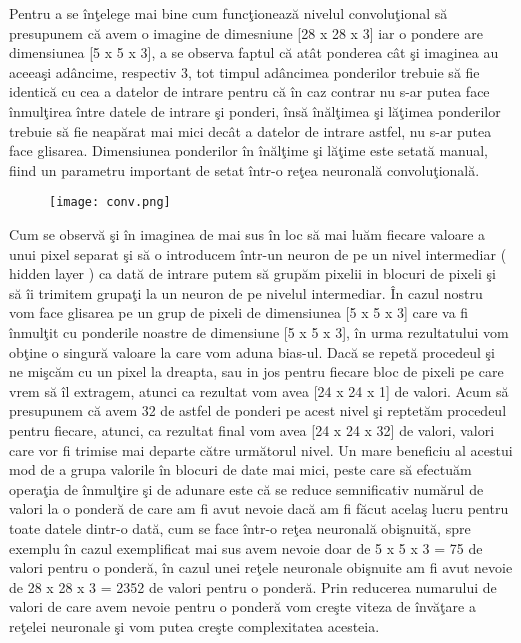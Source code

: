 \par

Pentru a se \^{i}n\c{t}elege mai bine cum func\c{t}ioneaz\u{a} nivelul convolu\c{t}ional s\u{a} presupunem c\u{a} avem o imagine de dimesniune [28 x 28 x 3] iar o pondere are dimensiunea [5 x 5 x 3], a se observa faptul c\u{a} at\^{a}t  ponderea c\^{a}t \c{s}i imaginea au aceea\c{s}i ad\^{a}ncime, respectiv 3, tot timpul ad\^{a}ncimea ponderilor trebuie s\u{a} fie identic\u{a} cu cea a datelor de intrare pentru c\u{a} \^{i}n caz contrar nu s-ar putea face \^{i}nmul\c{t}irea \^{i}ntre datele de intrare \c{s}i ponderi, \^{i}ns\u{a} \^{i}n\u{a}l\c{t}imea \c{s}i l\u{a}\c{t}imea ponderilor trebuie s\u{a} fie neap\u{a}rat mai mici dec\^{a}t a datelor de intrare astfel, nu s-ar putea face glisarea. Dimensiunea ponderilor \^{i}n \^{i}n\u{a}l\c{t}ime \c{s}i l\u{a}\c{t}ime este setat\u{a} manual, fiind un parametru important de setat \^{i}ntr-o re\c{t}ea neuronal\u{a} convolu\c{t}ional\u{a}. 

\begin{figure}[h!]
  \centering
  \texttt{[image: conv.png]}
\end{figure}

Cum se observ\u{a} \c{s}i \^{i}n imaginea de mai sus \^{i}n loc s\u{a} mai lu\u{a}m fiecare valoare a unui pixel separat \c{s}i s\u{a} o introducem \^{i}ntr-un neuron de pe un nivel intermediar ( hidden layer ) ca dat\u{a} de intrare putem s\u{a} grup\u{a}m pixelii in blocuri de pixeli \c{s}i s\u{a} \^{i}i trimitem grupa\c{t}i la un neuron de pe nivelul intermediar. \^{I}n cazul nostru vom face glisarea pe un grup de pixeli de dimensiunea [5 x 5 x 3] care va fi \^{i}nmul\c{t}it cu ponderile noastre de dimensiune [5 x 5 x 3], \^{i}n urma rezultatului vom ob\c{t}ine o singur\u{a} valoare la care vom aduna bias-ul. Dac\u{a} se repet\u{a} procedeul  \c{s}i ne mi\c{s}c\u{a}m cu un pixel la dreapta, sau in jos pentru fiecare bloc de pixeli pe care vrem s\u{a} \^{i}l extragem, atunci ca rezultat vom avea [24 x 24 x 1] de valori. Acum s\u{a} presupunem c\u{a} avem 32 de astfel de ponderi pe acest nivel \c{s}i reptet\u{a}m procedeul pentru fiecare, atunci, ca rezultat final vom avea [24 x 24 x 32] de valori, valori care vor fi trimise mai departe c\u{a}tre urm\u{a}torul nivel. Un mare beneficiu al acestui mod de a grupa valorile \^{i}n blocuri de date mai mici, peste care s\u{a} efectu\u{a}m opera\c{t}ia de \^{i}nmul\c{t}ire \c{s}i de adunare este c\u{a} se reduce semnificativ num\u{a}rul de valori la o  ponder\u{a} de care am fi avut nevoie dac\u{a} am fi f\u{a}cut acela\c{s} lucru pentru toate datele dintr-o dat\u{a}, cum se face \^{i}ntr-o re\c{t}ea neuronal\u{a} obi\c{s}nuit\u{a}, spre exemplu \^{i}n cazul exemplificat mai sus avem nevoie doar de 5 x 5 x 3 = 75 de valori pentru o ponder\u{a}, \^{i}n cazul unei re\c{t}ele neuronale obi\c{s}nuite am fi avut nevoie de 28 x 28 x 3 = 2352 de valori pentru o ponder\u{a}. Prin reducerea numarului de valori de care avem nevoie pentru o ponder\u{a} vom cre\c{s}te viteza de \^{i}nv\u{a}\c{t}are a re\c{t}elei neuronale \c{s}i vom putea cre\c{s}te complexitatea acesteia.

